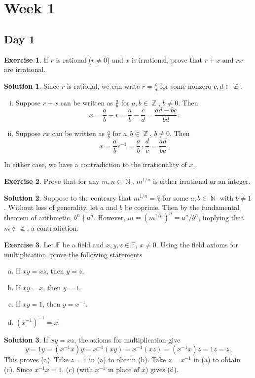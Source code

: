 \documentclass{article}
\theoremstyle{definition}
\newtheorem{exercise}{Exercise}
\newtheorem*{solution}{Solution}
\DeclareMathOperator{\N}{\mathbb{N}}
\DeclareMathOperator{\Z}{\mathbb{Z}}
\begin{document}
\section*{Week 1}
\subsection*{Day 1}

\begin{exercise}
    If \(r\) is rational (\(r\neq0\)) and \(x\) is irrational, prove that \(r+x\) and \(rx\) are irrational.
\end{exercise}
\begin{solution}
    Since \(r\) is rational, we can write \(r=\frac{c}{d}\) for some nonzero \(c,d\in\Z\).
    \begin{enumerate}[(i)]
        \item Suppose \(r+x\) can be written as \(\frac{a}{b}\) for \(a,b\in\Z\), \(b\neq0\). Then 
        \[x=\frac{a}{b}-r=\frac{a}{b}-\frac{c}{d}=\frac{ad-bc}{bd}.\]
        \item Suppose \(rx\) can be written as \(\frac{a}{b}\) for \(a,b\in\Z\), \(b\neq0\). Then
        \[x=\frac{a}{b}r^{-1}=\frac{a}{b}\cdot\frac{d}{c}=\frac{ad}{bc}.\]
    \end{enumerate}
    In either case, we have a contradiction to the irrationality of \(x\).
\end{solution}

\begin{exercise}
    Prove that for any \(m,n\in\N\), \(m^{1/n}\) is either irrational or an integer.
\end{exercise}
\begin{solution}
    Suppose to the contrary that \(m^{1/n}=\frac{a}{b}\) for some \(a,b\in\N\) with \(b\neq1\). Without loss of generality, let \(a\) and \(b\) be coprime. Then by the fundamental theorem of arithmetic, \(b^n\nmid a^n\). However, \(m=(m^{1/n})^n=a^n/b^n\), implying that \(m\not\in\Z\), a contradiction.
\end{solution}

\begin{exercise}
    Let \(\mathbb{F}\) be a field and \(x,y,z\in\mathbb{F}\), \(x\neq0\). Using the field axioms for multiplication, prove the following statements
    \begin{enumerate}[(a)]
        \item If \(xy=xz\), then \(y=z\).
        \item If \(xy=x\), then \(y=1\).
        \item If \(xy=1\), then \(y=x^{-1}\).
        \item \((x^{-1})^{-1}=x\).
    \end{enumerate}
\end{exercise}
\begin{solution}
    If \(xy=xz\), the axioms for multiplication give
    \[y=1y=(x^{-1}x)y=x^{-1}(xy)=x^{-1}(xz)=(x^{-1}x)z=1z=z.\]
    This proves (a). Take \(z=1\) in (a) to obtain (b). Take \(z=x^{-1}\) in (a) to obtain (c). Since \(x^{-1}x=1\), (c) (with \(x^{-1}\) in place of \(x\)) gives (d).
\end{solution}
\end{document}
